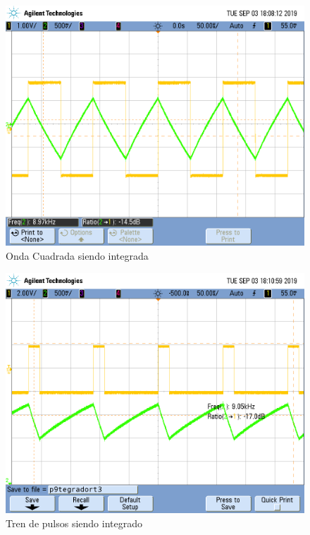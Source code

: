 \begin{figure}[H]
	\centering
	\includegraphics[width=\textwidth]{Ejercicio4/FOTOS-TP2-TC-EJ4/i9tegradort}
	\caption{Onda Cuadrada siendo integrada}
\end{figure}

\begin{figure}[H]
	\centering
	\includegraphics[width=\textwidth]{Ejercicio4/FOTOS-TP2-TC-EJ4/p9tegradort3}
	\caption{Tren de pulsos siendo integrado}
\end{figure}

